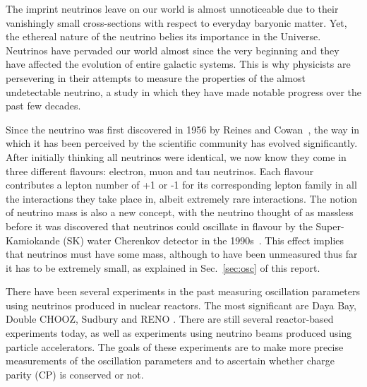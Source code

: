 \documentclass[aps,pra,12pt,notitlepage,tightenlines]{revtex4-1}
\begin{document}
The imprint neutrinos leave on our world is almost unnoticeable due to their vanishingly small cross-sections with respect to everyday baryonic matter. Yet, the ethereal nature of the neutrino belies its importance in the Universe. Neutrinos have pervaded our world almost since the very beginning and they have affected the evolution of entire galactic systems. This is why physicists are persevering in their attempts to measure the properties of the almost undetectable neutrino, a study in which they have made notable progress over the past few decades. 

Since the neutrino was first discovered in 1956 by Reines and Cowan~\cite{1956Natur.178..446R}, the way in which it has been perceived by the scientific community has evolved significantly. After initially thinking all neutrinos were identical, we now know they come in three different flavours: electron, muon and tau neutrinos. Each flavour contributes a lepton number of +1 or -1 for its corresponding lepton family in all the interactions they take place in, albeit extremely rare interactions. The notion of neutrino mass is also a new concept, with the neutrino thought of as massless before it was discovered that neutrinos could oscillate in flavour by the Super-Kamiokande (SK) water Cherenkov detector in the 1990s~\cite{Fukuda1998}. This effect implies that neutrinos must have some mass, although to have been unmeasured thus far it has to be extremely small, as explained in Sec.\ \ref{sec:osc} of this report.


There have been several experiments in the past measuring oscillation parameters using neutrinos produced in nuclear reactors. The most significant are Daya Bay, Double CHOOZ, Sudbury and RENO \cite{PhysRevLett.108.171803, PhysRevLett.108.131801, PhysRevLett.89.011301, PhysRevLett.108.191802}. There are still several reactor-based experiments today, as well as experiments using neutrino beams produced using particle accelerators. The goals of these experiments are to make more precise measurements of the oscillation parameters and to ascertain whether charge parity (CP) is conserved or not.
\end{document}
